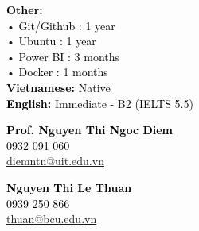 \documentclass[10pt,a4paper,ragged2e,withhyper]{altacv}
\begin{document}
\begin{paracol}{2}
            \textcolor{black}{\textbf{Other:}} \\
            \vspace{0.8em}
            \hspace{3em} • \hspace{0.5em} \textcolor{black}{Git/Github : 1 year} \\
            \vspace{0.5em}
            \hspace{3em} • \hspace{0.5em} \textcolor{black}{Ubuntu : 1 year} \\
            \vspace{0.5em}
            \hspace{3em} • \hspace{0.5em} \textcolor{black}{Power BI : 3 months} \\
            \vspace{0.5em}
            \hspace{3em} • \hspace{0.5em} \textcolor{black}{Docker : 1 months} \\
        
            \textcolor{black}{\textbf{Vietnamese:}}  \textcolor{black}{Native} \\
            \vspace{0.8em}
            \textcolor{black}{\textbf{English:}}  \textcolor{black}{Immediate - B2 (IELTS 5.5)}
            
            \textcolor{black}{\textbf{Prof. Nguyen Thi Ngoc Diem}} \\
            \vspace{0.5em}
            \textcolor{blue}{}  \textcolor{black}{0932 091 060} \\
            \vspace{0.5em}
            \textcolor{blue}{} \textcolor{black}{\href{mailto:diemntn@uit.edu.vn}{diemntn@uit.edu.vn}} \\
            \vspace{2em}
            
            \textcolor{black}{\textbf{Nguyen Thi Le Thuan}} \\
            \vspace{0.5em}
            \textcolor{blue}{}  \textcolor{black}{0939 250 866} \\
            \vspace{0.5em}
            \textcolor{blue}{} \textcolor{black}{\href{mailto:thuan@bcu.edu.vn}{thuan@bcu.edu.vn}} \\
            \vspace{8.25em} \textcolor{black}{}
        

\end{paracol}
\end{document}
